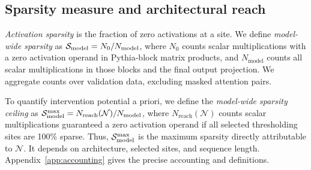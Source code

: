 \subsection{Sparsity measure and architectural reach}
\label{sec:measurement}

\emph{Activation sparsity} is the fraction of zero activations at a site. We define \emph{model-wide sparsity} as $\mathcal{S}_{\mathrm{model}}=N_0/N_{\mathrm{model}}$, where $N_0$ counts scalar multiplications with a zero activation operand in Pythia-block matrix products, and $N_{\mathrm{model}}$ counts all scalar multiplications in those blocks and the final output projection. We aggregate counts over validation data, excluding masked attention pairs. 

To quantify intervention potential a priori, we define the \emph{model-wide sparsity ceiling} as $\mathcal{S}_{\mathrm{model}}^{\max}=N_{\mathrm{reach}}(\mathcal{N})/N_{\mathrm{model}}$, where $N_{\mathrm{reach}}(\mathcal{N})$ counts scalar multiplications guaranteed a zero activation operand if all selected thresholding sites are 100\% sparse. Thus, $\mathcal{S}_{\mathrm{model}}^{\max}$ is the maximum sparsity directly attributable to $\mathcal{N}$. It depends on architecture, selected sites, and sequence length. Appendix~\ref{app:accounting} gives the precise accounting and definitions.
